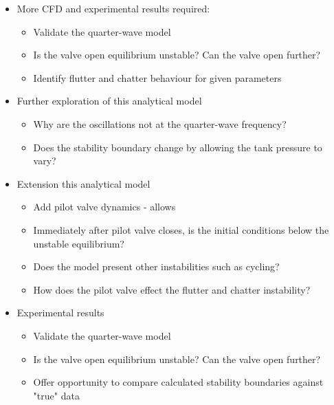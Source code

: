 

\newpage
\begin{itemize}
    \item More CFD and experimental results required:
    \begin{itemize}
        \item Validate the quarter-wave model
        \item Is the valve open equilibrium unstable? Can the valve open further?
        \item Identify flutter and chatter behaviour for given parameters
    \end{itemize}
    \item Further exploration of this analytical model
    \begin{itemize}
        \item Why are the oscillations not at the quarter-wave frequency?
        \item Does the stability boundary change by allowing the tank pressure to vary?
    \end{itemize}
    \item Extension this analytical model
    \begin{itemize}
        \item Add pilot valve dynamics - allows 
        \item Immediately after pilot valve closes, is the initial conditions below the unstable equilibrium?
        \item Does the model present other instabilities such as cycling?
        \item How does the pilot valve effect the flutter and chatter instability?
    \end{itemize}
    \item Experimental results
        \begin{itemize}
        \item Validate the quarter-wave model
        \item Is the valve open equilibrium unstable? Can the valve open further?
        \item Offer opportunity to compare calculated stability boundaries against "true" data
    \end{itemize}
\end{itemize}